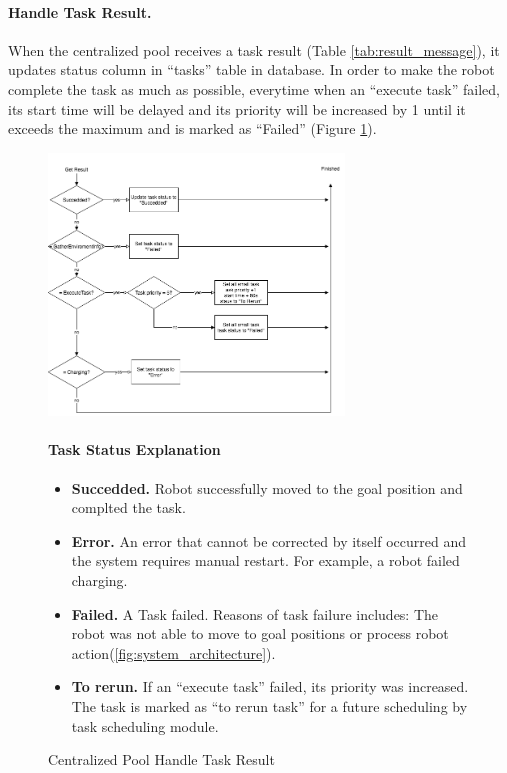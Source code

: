 \paragraph{Handle Task Result.}
When the centralized pool receives a task result (Table \ref{tab:result_message}), it updates status column in ``tasks'' table in database. 
In order to make the robot complete the task as much as possible, everytime when an ``execute task'' failed, its start time will be delayed and its priority will be increased by 1 until it exceeds the maximum and is marked as ``Failed'' 
(Figure \ref{fig:centralized_task_handle}).


\begin{figure}[htbp]
    \centering
    \includegraphics[width = 0.7\textwidth]{content/images/ch4/centralized_task_result.drawio.png}
    \caption{Centralized Pool Handle Task Result}
    \label{fig:centralized_task_handle}
    \paragraph{Task Status Explanation}
    \begin{itemize}     
        \item \textbf{Succedded.} Robot successfully moved to the goal position and complted the task.
        \item \textbf{Error.} An error that cannot be corrected by itself occurred and the system requires manual restart. For example, a robot failed charging.
        \item \textbf{Failed.} A Task failed. Reasons of task failure includes: The robot was not able to move to goal positions or process robot action(\ref{fig:system_architecture}). 
        \item \textbf{To rerun.} If an ``execute task'' failed, its priority was increased. The task is marked as ``to rerun task''  for a future scheduling by task scheduling module.
    \end{itemize}   
\end{figure}


